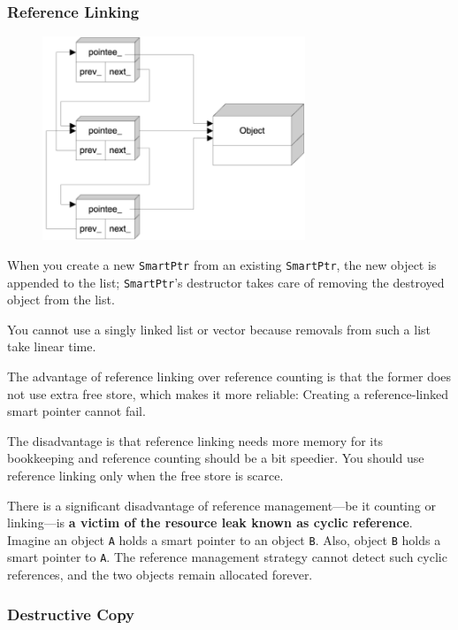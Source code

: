 \subsubsection{Reference Linking}

\begin{figure}[H]
    \centering
    \includegraphics[width=0.7\textwidth]{fig/refLinking.png}
 \end{figure}

When you create a new \texttt{SmartPtr} from an existing
\texttt{SmartPtr}, the new object is appended to the list;
\texttt{SmartPtr}'s destructor takes care of removing the destroyed
object from the list. 

You cannot use a singly linked list or vector because removals from
such a list take linear time.

The advantage of reference linking over reference counting is that the
former does not use extra free store, which makes it more reliable:
Creating a reference-linked smart pointer cannot fail.

The disadvantage is that reference linking needs more memory for its
bookkeeping and reference counting should be a bit speedier. You
should use reference linking only when the free store is scarce.

There is  a significant disadvantage of reference management—be it
counting or linking—is \textbf{a victim of the resource leak known as
  cyclic reference}.  Imagine an object \texttt{A} holds a smart
pointer to an object \texttt{B}. Also, object \texttt{B} holds a smart
pointer to \texttt{A}. The reference management strategy cannot detect
such cyclic references, and the two objects remain allocated forever.

\subsubsection{Destructive Copy}

